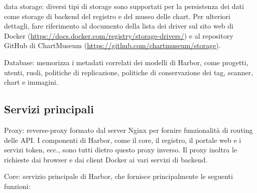 \documentclass[12pt]{report}
\begin{document}
data storage: diversi tipi di storage sono supportati per la persistenza dei dati come storage di backend del registro e del museo delle chart. Per ulteriori dettagli, fare riferimento al documento della lista dei driver sul sito web di Docker (\url{https://docs.docker.com/registry/storage-drivers/}) e al repository GitHub di ChartMuseum (\url{https://github.com/chartmuseum/storage}).

Database: memorizza i metadati correlati dei modelli di Harbor, come progetti, utenti, ruoli, politiche di replicazione, politiche di conservazione dei tag, scanner, chart e immagini.

\subsection{Servizi principali}

Proxy: reverse-proxy formato dal server Nginx per fornire funzionalità di routing delle API. I componenti di Harbor, come il core, il registro, il portale web e i servizi token, ecc., sono tutti dietro questo proxy inverso. Il proxy inoltra le richieste dai browser e dai client Docker ai vari servizi di backend.

Core: servizio principale di Harbor, che fornisce principalmente le seguenti funzioni:
\end{document}
